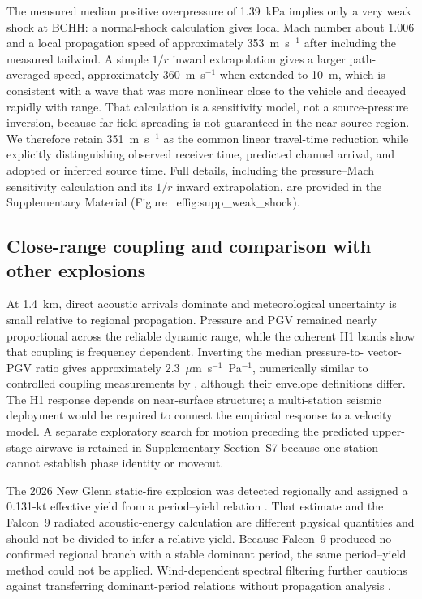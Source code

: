 \documentclass[]{seismica}
\begin{document}
The measured median positive overpressure of 1.39~kPa implies only a very weak
shock at BCHH: a normal-shock calculation gives local Mach number about 1.006
and a local propagation speed of approximately 353~m~s$^{-1}$ after including
the measured tailwind. A simple $1/r$ inward extrapolation gives a larger
path-averaged speed, approximately 360~m~s$^{-1}$ when extended to 10~m, which
is consistent with a wave that was more nonlinear close to the vehicle and
decayed rapidly with range. That calculation is a sensitivity model, not a
source-pressure inversion, because far-field spreading is not guaranteed in
the near-source region. We therefore retain 351~m~s$^{-1}$ as the common linear
travel-time reduction while explicitly distinguishing observed receiver time,
predicted channel arrival, and adopted or inferred source time. Full details,
including the pressure--Mach sensitivity calculation and its $1/r$ inward
extrapolation, are provided in the Supplementary Material
(Figure~
ef{fig:supp_weak_shock}).

\subsection{Close-range coupling and comparison with other explosions}

At 1.4~km, direct acoustic arrivals dominate and meteorological uncertainty is
small relative to regional propagation. Pressure and PGV remained nearly
proportional across the reliable dynamic range, while the coherent H1 bands
show that coupling is frequency dependent. Inverting the median pressure-to-
vector-PGV ratio gives approximately
2.3~$\mu$m~s$^{-1}$~Pa$^{-1}$, numerically similar to controlled coupling
measurements by \citet{novoselov_ground_coupling_2020}, although their envelope
definitions differ. The H1 response depends on near-surface structure; a
multi-station seismic deployment would be required to connect the empirical
response to a velocity model. A separate exploratory search for motion
preceding the predicted upper-stage airwave is retained in Supplementary
Section~S7 because one station cannot establish phase identity or moveout.

The 2026 New Glenn static-fire explosion was detected regionally and assigned
a 0.131-kt effective yield from a period--yield relation
\citep{silber_scamfer_newglenn_2026}. That estimate and the Falcon~9 radiated
acoustic-energy calculation are different physical quantities and should not
be divided to infer a relative yield. Because Falcon~9 produced no confirmed
regional branch with a stable dominant period, the same period--yield method
could not be applied. Wind-dependent spectral filtering further cautions
against transferring dominant-period relations without propagation analysis
\citep{silber_wind_filtering_2026}.
\end{document}

